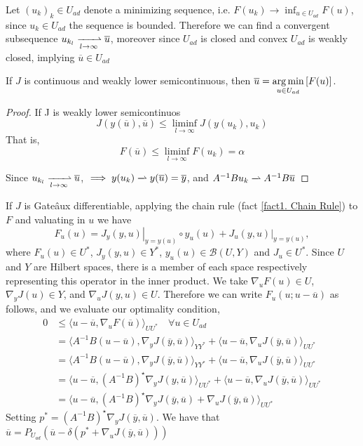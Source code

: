 Let $(u_k)_k \in U_{ad}$ denote a minimizing sequence, i.e. $F(u_k) \rightarrow \inf_{u\in U_{ad}}F(u)$, since $u_k \in U_{ad}$ the sequence is bounded. Therefore we can find a convergent subsequence $u_{k_{l}} \xrightharpoonup[l\rightarrow \infty]{} \overline{u}$, moreover since $U_{ad}$ is closed and convex $U_{ad}$ is weakly closed, implying $\overline{u} \in U_{ad}$

\begin{proposition}
	If $J$ is continuous and weakly lower semicontinuous, then 	$\overline{u}={\displaystyle {\underset {u\in U_{ad}}{\operatorname {arg\,min} }}\left[F(u)\right]}$.
	\begin{proof}
		If J is weakly lower semicontinuos 
			\[
				J(y(\overline{u}), \overline{u})\leq \liminf_{l\rightarrow \infty} J(y(u_k),u_k)
			\]
		That is, 
		\[
			F(\overline{u}) \leq \liminf_{l\rightarrow \infty} F(u_k) =\alpha 
		\]

	
	Since $u_{k_{l}} \xrightharpoonup[l\rightarrow \infty]{} \overline{u}$, $\implies y(u_k) \xrightharpoonup[]{} y(\overline{u})=\overline{y}$, and $A^{-1}B u_k \xrightharpoonup[]{}A^{-1}B  \overline{u}$
	\end{proof}
\end{proposition}
	If $J$ is Gate\^aux differentiable, applying the chain rule (fact \ref{fact1. Chain Rule}) to $F$ and valuating in $u$ we have
	\[
		F_u(u)=\left.J_y(y,u)\right|_{y=y(u)}\circ y_u(u)+\left.J_u(y,u)\right|_{y=y(u)},
	\]
	where $F_u(u) \in U^*$, $J_y(y,u) \in Y^*$, $y_u(u) \in \mathcal{B}(U, Y)$ and $J_u \in U^*$. Since $U$ and $Y$ are Hilbert spaces, there is a member of each space respectively representing this operator in the inner product. We take $\nabla_u F(u) \in U$,  $\nabla_y J(u) \in Y$, and $\nabla_u J(y, u) \in U$. Therefore we can write $F_u(u;u-\overline{u})$ as follows, and we evaluate our optimality condition,
	\begin{align*}
		0 &\leq \langle u-\overline{u}, \nabla_u F(\overline{u}) \rangle_{UU^*} \quad \forall u \in U_{ad}\\
		&= \langle A^{-1}B(u -\overline{u}), 
		\nabla_y J(\overline{y}, \overline{u}) \rangle_{YY^*}+\langle u-\overline{u},  \nabla_u J(\overline{y},\overline{u})\rangle_{UU^*} \\
		&= \langle A^{-1}B(u -\overline{u}), 
		\nabla_y J(\overline{y}, \overline{u}) \rangle_{YY^*}+\langle u-\overline{u},  \nabla_u J(\overline{y},\overline{u})\rangle_{UU^*} \\
		&= \langle u -\overline{u}, 
		(A^{-1}B)^\star\nabla_y J(y, \overline{u}) \rangle_{UU^*}+\langle u-\overline{u},  \nabla_u J(\overline{y},\overline{u})\rangle_{UU^*} \\
		&= \langle u -\overline{u}, 
		(A^{-1}B)^\star\nabla_y J(\overline{y}, \overline{u})+\nabla_u J(\overline{y},\overline{u})\rangle_{UU^*}
	\end{align*}
	Setting $p^*=(A^{-1}B)^\star\nabla_y J(\overline{y}, \overline{u})$. We have that $\overline{u}=P_{U_{ad}}(\overline{u}-\delta(p^*+\nabla_u J(\overline{y}, \overline{u})))$
